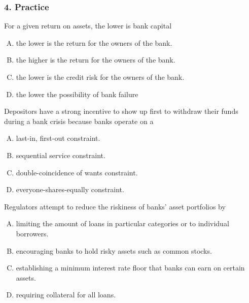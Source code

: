 \documentclass{beamer}
\begin{document}
\begin{practiceframe}
\frametitle{4. Practice}
\vspace{-1em}

    For a given return on assets, the lower is bank capital
    \begin{enumerate}[A. ]
        \item the lower is the return for the owners of the bank.
        \item the higher is the return for the owners of the bank.
        \item the lower is the credit risk for the owners of the bank.
        \item the lower the possibility of bank failure
    \end{enumerate}

    Depositors have a strong incentive to show up first to withdraw their funds during a bank crisis because banks operate on a
    \begin{enumerate}[A. ]
        \item last-in, first-out constraint.
        \item sequential service constraint.
        \item double-coincidence of wants constraint.
        \item everyone-shares-equally constraint.
    \end{enumerate}

    Regulators attempt to reduce the riskiness of banks' asset portfolios by
    \begin{enumerate}[A. ]
        \item limiting the amount of loans in particular categories or to individual borrowers.
        \item encouraging banks to hold risky assets such as common stocks.
        \item establishing a minimum interest rate floor that banks can earn on certain assets.
        \item requiring collateral for all loans.
    \end{enumerate}
    



\end{practiceframe}
\end{document}
